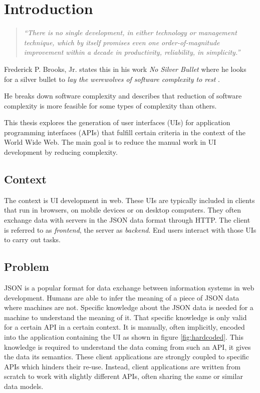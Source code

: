 \section{Introduction}\label{introduction}

\begin{quotation}
\textit{``There is no single development, in either technology or management technique, which by itself promises even one order-of-magnitude improvement within a decade in productivity, reliability, in simplicity.''} \citep[p.~1]{nosilverbullet}
\end{quotation}

Frederick P. Brooks, Jr. states this in his work \textit{No Silver Bullet} where he looks for a silver bullet to \textit{lay the werewolves of software complexity to rest} \citep[p.~1]{nosilverbullet}.

He breaks down software complexity and describes that reduction of software complexity is more feasible for some types of complexity than others.

This thesis explores the generation of user interfaces (UIs) for application programming interfaces (APIs) that fulfill certain criteria in the context of the World Wide Web. The main goal is to reduce the manual work in UI development by reducing complexity.

\subsection{Context}\label{context}
The context is UI development in web. These UIs are typically included in clients that run in browsers, on mobile devices or on desktop computers. They often exchange data with servers in the JSON data format \citep{jsonformat} through HTTP. The client is referred to as \textit{\gls{frontend}}, the server as \textit{\gls{backend}}. End users interact with those UIs to carry out tasks.

\subsection{Problem}\label{problem}
JSON is a popular format for data exchange between information systems in web development. Humans are able to infer the meaning of a piece of JSON data where machines are not. Specific knowledge about the JSON data is needed for a machine to understand the meaning of it. That specific knowledge is only valid for a certain API in a certain context. It is manually, often implicitly, encoded into the application containing the UI as shown in figure \ref{fig:hardcoded}. This knowledge is required to understand the data coming from such an API, it gives the data its semantics. These client applications are strongly coupled to specific APIs which hinders their re-use. Instead, client applications are written from scratch to work with slightly different APIs, often sharing the same or similar data models.

